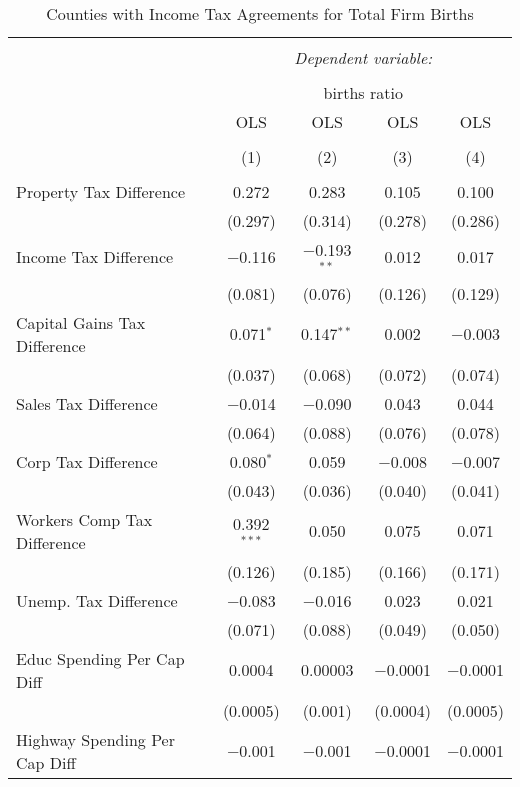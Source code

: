 
\begin{table}[!htbp] \centering 
  \caption{Counties with Income Tax Agreements for  Total Firm Births} 
  \label{--rd} 
\begin{tabular}{@{\extracolsep{5pt}}lcccc} 
\\[-1.8ex]\hline 
\hline \\[-1.8ex] 
 & \multicolumn{4}{c}{\textit{Dependent variable:}} \\ 
\cline{2-5} 
\\[-1.8ex] & \multicolumn{4}{c}{births ratio} \\ 
 & OLS & OLS & OLS & OLS \\ 
\\[-1.8ex] & (1) & (2) & (3) & (4)\\ 
\hline \\[-1.8ex] 
 Property Tax Difference & 0.272 & 0.283 & 0.105 & 0.100 \\ 
  & (0.297) & (0.314) & (0.278) & (0.286) \\ 
  Income Tax Difference & $-$0.116 & $-$0.193$^{**}$ & 0.012 & 0.017 \\ 
  & (0.081) & (0.076) & (0.126) & (0.129) \\ 
  Capital Gains Tax Difference & 0.071$^{*}$ & 0.147$^{**}$ & 0.002 & $-$0.003 \\ 
  & (0.037) & (0.068) & (0.072) & (0.074) \\ 
  Sales Tax Difference & $-$0.014 & $-$0.090 & 0.043 & 0.044 \\ 
  & (0.064) & (0.088) & (0.076) & (0.078) \\ 
  Corp Tax Difference & 0.080$^{*}$ & 0.059 & $-$0.008 & $-$0.007 \\ 
  & (0.043) & (0.036) & (0.040) & (0.041) \\ 
  Workers Comp Tax Difference & 0.392$^{***}$ & 0.050 & 0.075 & 0.071 \\ 
  & (0.126) & (0.185) & (0.166) & (0.171) \\ 
  Unemp. Tax Difference & $-$0.083 & $-$0.016 & 0.023 & 0.021 \\ 
  & (0.071) & (0.088) & (0.049) & (0.050) \\ 
  Educ Spending Per Cap Diff & 0.0004 & 0.00003 & $-$0.0001 & $-$0.0001 \\ 
  & (0.0005) & (0.001) & (0.0004) & (0.0005) \\ 
  Highway Spending Per Cap Diff & $-$0.001 & $-$0.001 & $-$0.0001 & $-$0.0001 \\ 

\end{tabular}
\end{table}
